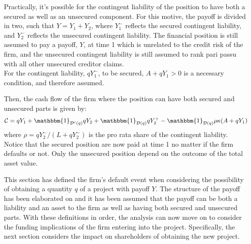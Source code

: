 \documentclass[main.tex]{subfiles}
\begin{document}
        Practically, it's possible for the contingent liability of the position
        to have both a secured as well as an unsecured component.
        For this motive, the payoff is divided in two, such that $Y=Y_1 + Y_2$, where $Y_1^{-}$ reflects the secured contingent liability, and $Y_2^{-}$ reflects the unsecured contingent liability.
        The financial position is still assumed to pay a payoff, $Y$, at time 1 which is unrelated to the credit risk of the firm, and the unsecured contingent liability is still assumed to rank pari passu with all other unsecured creditor claims.\\
        For the contingent liability, $qY_1^{-}$, to be secured, $A+qY_1 > 0$ is a necessary condition, and therefore assumed.

        Then, the cash flow of the firm where the position 
        can have both secured and unsecured parts is given by:
        \begin{equation}
            \mathcal{C} =
                q Y_{1}
                + \mathbbm{1}_{\mathcal{D}^{c}(q)} qY_{2}
                + \mathbbm{1}_{\mathcal{D}(q)} qY_{2}^{+}
                - \mathbbm{1}_{\mathcal{D}(q)} \rho\kappa (A + qY_{1})
        \end{equation}
        where $\rho = qY_{2}^{-}/(L + qY_{2}^{-})$ is the pro rata share of the contingent liability. 
        Notice that the secured position are now paid at time 1 no matter if the firm defaults or not. 
        Only the unsecured position depend on the outcome of the total asset value.

        This section has defined the firm's default event when considering the possibility
        of obtaining a quantity $q$ of a project with payoff $Y$.
        The structure of the payoff has been elaborated on
        and it has been assumed that the payoff can be both a liability and an asset to the firm
        as well as having both secured and unsecured parts.
        With these definitions in order, the analysis can now move on to consider the
        funding implications of the firm entering into the project.
        Specifically, the next section considers the impact on shareholders 
        of obtaining the new project.
        
\end{document}
